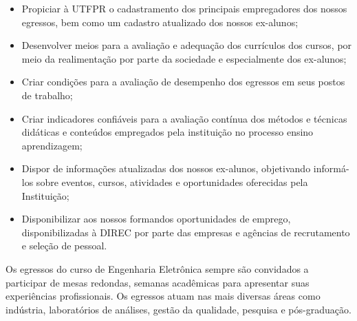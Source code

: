 \begin{itemize}
    \item Propiciar à UTFPR o cadastramento dos principais empregadores dos nossos egressos, bem como um cadastro atualizado dos nossos ex-alunos;
    \item Desenvolver meios para a avaliação e adequação dos currículos dos cursos, por meio da realimentação por parte da sociedade e especialmente dos ex-alunos;
    \item Criar condições para a avaliação de desempenho dos egressos em seus postos de trabalho;
    \item Criar indicadores confiáveis para a avaliação contínua dos métodos e técnicas didáticas e conteúdos empregados pela instituição no processo ensino aprendizagem;
    \item Dispor de informações atualizadas dos nossos ex-alunos, objetivando informá-los sobre eventos, cursos, atividades e oportunidades oferecidas pela Instituição;
    \item Disponibilizar aos nossos formandos oportunidades de emprego, disponibilizadas à DIREC por parte das empresas e agências de recrutamento e seleção de pessoal.
\end{itemize}    

Os egressos do curso de Engenharia Eletrônica sempre são convidados a participar de mesas redondas, semanas acadêmicas para apresentar suas experiências profissionais. Os egressos atuam nas mais diversas áreas como indústria, laboratórios de análises, gestão da qualidade, pesquisa e pós-graduação.
